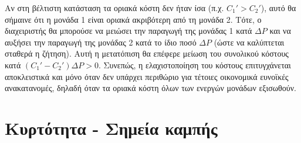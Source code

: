 \begin{alist}
Αν στη βέλτιστη κατάσταση τα οριακά κόστη δεν ήταν ίσα (π.χ. $C_1' > C_2'$), αυτό θα σήμαινε ότι η μονάδα 1 είναι οριακά ακριβότερη από τη μονάδα 2. Τότε, ο διαχειριστής θα μπορούσε να μειώσει την παραγωγή της μονάδας 1 κατά $\Delta P$ και να αυξήσει την παραγωγή της μονάδας 2 κατά το ίδιο ποσό $\Delta P$ (ώστε να καλύπτεται σταθερά η ζήτηση). Αυτή η μετατόπιση θα επέφερε μείωση του συνολικού κόστους κατά $(C_1' - C_2')\Delta P > 0$. Συνεπώς, η ελαχιστοποίηση του κόστους επιτυγχάνεται αποκλειστικά και μόνο όταν δεν υπάρχει περιθώριο για τέτοιες οικονομικά ευνοϊκές ανακατανομές, δηλαδή όταν τα οριακά κόστη όλων των ενεργών μονάδων εξισωθούν.
\end{alist}

\section{Κυρτότητα - Σημεία καμπής}

